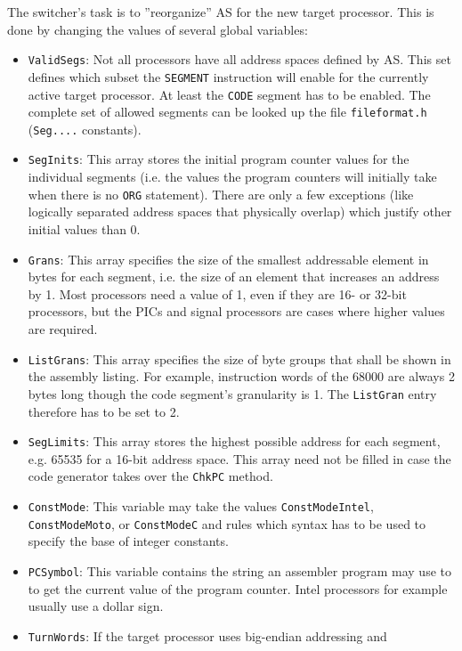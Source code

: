 \documentclass[12pt,twoside]{report}
\newcommand{\tty}[1]{{\tt #1}}
\begin{document}
The switcher's task is to ''reorganize'' AS for the new target
processor.  This is done by changing the values of several global
variables:
\begin{itemize}
\item{\tty{ValidSegs}: Not all processors have all address spaces defined
      by AS.  This set defines which subset the \tty{SEGMENT} instruction
      will enable for the currently active target processor.  At least the
      \tty{CODE} segment has to be enabled.  The complete set of allowed
      segments can be looked up the file \tty{fileformat.h} (\tty{Seg....}
      constants).}
\item{\tty{SegInits}: This array stores the initial program counter values
      for the individual segments (i.e. the values the program counters
      will initially take when there is no \tty{ORG} statement).  There are
      only a few exceptions (like logically separated address spaces
      that physically overlap) which justify other initial values than
      0.}
\item{\tty{Grans}: This array specifies the size of the smallest addressable
      element in bytes for each segment, i.e. the size of an element
      that increases an address by 1.  Most processors need a value of
      1, even if they are 16- or 32-bit processors, but the PICs and
      signal processors are cases where higher values are required.}
\item{\tty{ListGrans}: This array specifies the size of byte groups that shall
      be shown in the assembly listing.  For example, instruction words
      of the 68000 are always 2 bytes long though the code segment's
      granularity is 1.  The \tty{ListGran} entry therefore has to be set to
      2.}
\item{\tty{SegLimits}: This array stores the highest possible address for
      each segment, e.g. 65535 for a 16-bit address space.  This array
      need not be filled in case the code generator takes over the
      {\tt ChkPC} method.}
\item{\tty{ConstMode}: This variable may take the values
      \tty{ConstModeIntel}, \tty{ConstModeMoto}, or \tty{ConstModeC}
      and rules which syntax has to be used to specify the base of
      integer constants.}
\item{\tty{PCSymbol}: This variable contains the string an assembler program
      may use to to get the current value of the program counter.
      Intel processors for example usually use a dollar sign.}
\item{\tty{TurnWords}: If the target processor uses big-endian addressing and
}
\end{itemize}
\end{document}
